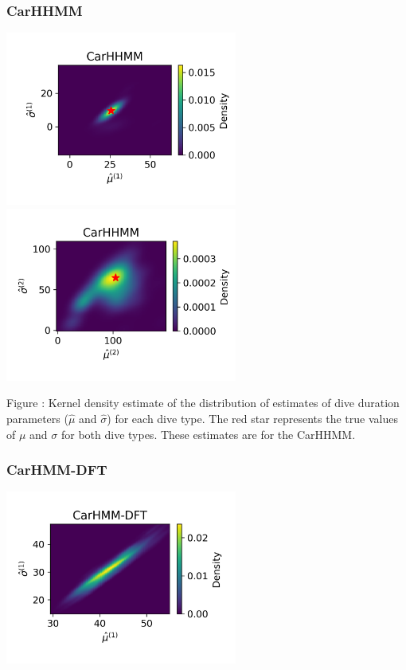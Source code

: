 \documentclass{article}
\begin{document}
        \subsubsection{CarHHMM}
        \begin{center}
        \includegraphics[width=3in]{../Plots/hhmm_V_MLE_density_dive_duration_-1_0.png}
        \includegraphics[width=3in]{../Plots/hhmm_V_MLE_density_dive_duration_-1_1.png}
        \end{center}
        
        \noindent Figure : Kernel density estimate of the distribution of estimates of dive duration parameters ($\hat \mu$ and $\hat \sigma$) for each dive type. The red star represents the true values of $\mu$ and $\sigma$ for both dive types. These estimates are for the CarHHMM.
        \addtocounter{fignum}{1}
        
        \subsubsection{CarHMM-DFT}
        \begin{center}
        \includegraphics[width=3in]{../Plots/hmm_FV_MLE_density_dive_duration_-1_0.png}
        \end{center}
        
\end{document}
